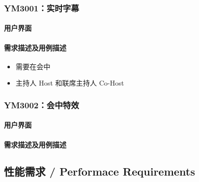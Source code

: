 \documentclass[]{ctexart}
\let\oldparagraph\paragraph
\renewcommand{\paragraph}[1]{\oldparagraph{#1}\mbox{}}
\begin{document}
\hypertarget{ym3001ux5b9eux65f6ux5b57ux5e55}{%
\subsubsection{YM3001：实时字幕}\label{ym3001ux5b9eux65f6ux5b57ux5e55}}

\hypertarget{ux7528ux6237ux754cux9762-4}{%
\paragraph{用户界面}\label{ux7528ux6237ux754cux9762-4}}

\hypertarget{ux9700ux6c42ux63cfux8ff0ux53caux7528ux4f8bux63cfux8ff0-4}{%
\paragraph{需求描述及用例描述}\label{ux9700ux6c42ux63cfux8ff0ux53caux7528ux4f8bux63cfux8ff0-4}}

\begin{itemize}
\item
  需要在会中
\item
  主持人 Host 和联席主持人 Co-Host
\end{itemize}

\hypertarget{ym3002ux4f1aux4e2dux7279ux6548}{%
\subsubsection{YM3002：会中特效}\label{ym3002ux4f1aux4e2dux7279ux6548}}

\hypertarget{ux7528ux6237ux754cux9762-5}{%
\paragraph{用户界面}\label{ux7528ux6237ux754cux9762-5}}

\hypertarget{ux9700ux6c42ux63cfux8ff0ux53caux7528ux4f8bux63cfux8ff0-5}{%
\paragraph{需求描述及用例描述}\label{ux9700ux6c42ux63cfux8ff0ux53caux7528ux4f8bux63cfux8ff0-5}}

\hypertarget{ux6027ux80fdux9700ux6c42--performace-requirements}{%
\subsection{性能需求 / Performace
Requirements}\label{ux6027ux80fdux9700ux6c42--performace-requirements}}
\end{document}

